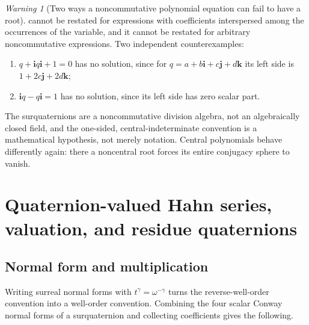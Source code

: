 \documentclass[11pt,letterpaper]{article}
\numberwithin{equation}{section}
\theoremstyle{definition}
\theoremstyle{remark}
\newtheorem{warning}[warning]{Warning}
\newcommand{\ii}{\mathbf i}
\newcommand{\jj}{\mathbf j}
\newcommand{\kk}{\mathbf k}
\begin{document}
\begin{warning}[Two ways a noncommutative polynomial equation can fail to have a root]
\label{squat:warn:interspersed}
 cannot be restated for expressions with coefficients interspersed
among the occurrences of the variable, and it cannot be restated for arbitrary
noncommutative expressions. Two independent counterexamples:
\begin{enumerate}[label=\textup{(\arabic*)},leftmargin=2.4em]
\item $q+\ii q\ii+1=0$ has no solution, since for $q=a+b\ii+c\jj+d\kk$ its left side is
$1+2c\jj+2d\kk$;
\item $\ii q-q\ii=1$ has no solution, since its left side has zero scalar part.
\end{enumerate}
The surquaternions are a noncommutative division algebra, not an algebraically closed
field, and the one-sided, central-indeterminate convention is a mathematical hypothesis,
not merely notation. Central polynomials behave differently again: there a noncentral root
forces its entire conjugacy sphere to vanish.
\end{warning}

\section{Quaternion-valued Hahn series, valuation, and residue quaternions}\label{squat:sec:hahn}

\subsection{Normal form and multiplication}\label{squat:sub:normalform}
Writing surreal normal forms with $t^\gamma=\omega^{-\gamma}$ turns the
reverse-well-order convention into a well-order convention. Combining the four scalar
Conway normal forms of a surquaternion and collecting coefficients gives the following.
\end{document}
